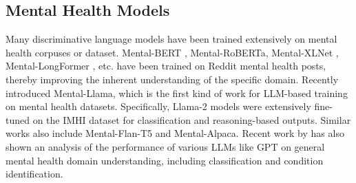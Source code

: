 \subsection{Mental Health Models}
Many discriminative language models have been trained extensively on mental health corpuses or dataset. Mental-BERT \cite{MentalBERT}, Mental-RoBERTa, Mental-XLNet \cite{mentalXLNET}, Mental-LongFormer \cite{mentalXLNET}, etc. have been trained on Reddit mental health posts, thereby improving the inherent understanding of the specific domain. Recently \cite{mentallama} introduced Mental-Llama, which is the first kind of work for LLM-based training on mental health datasets. Specifically, Llama-2 models were extensively fine-tuned on the IMHI dataset for classification and reasoning-based outputs. Similar works also include Mental-Flan-T5 and Mental-Alpaca. Recent work by \cite{interpret-mental-health} has also shown an analysis of the performance of various LLMs like GPT on general mental health domain understanding, including classification and condition identification.





